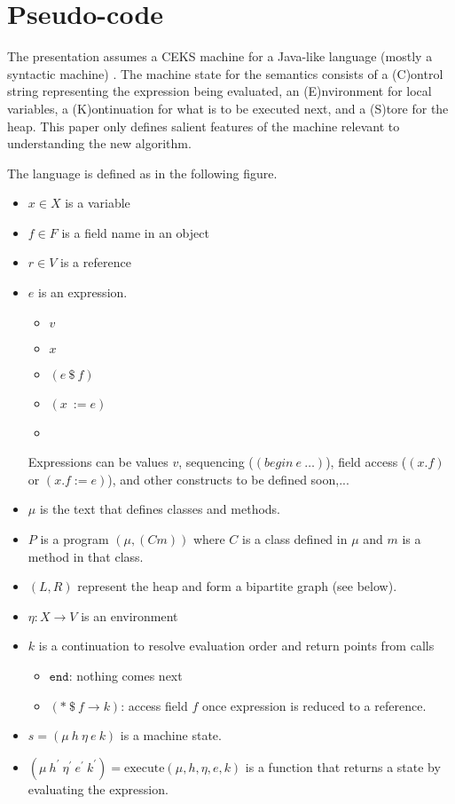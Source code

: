 \section{Pseudo-code}
The presentation assumes a CEKS machine for a Java-like language
(mostly a syntactic machine) \cite{saints-MS}. The machine state for
the semantics consists of a (C)ontrol string representing the
expression being evaluated, an (E)nvironment for local variables, a
(K)ontinuation for what is to be executed next, and a (S)tore for the
heap. This paper only defines salient features of the machine relevant
to understanding the new algorithm.

The language is defined as in the following figure.


\begin{itemize}
\item $x \in X$ is a variable
\item $f\in F$ is a field name in an object
\item $r\in V$ is a reference
\item $e$ is an expression.
  \begin{itemize}
  \item $v$
  \item $x$
  \item $(e\ \$\ f)$
  \item $(x\ := e)$
  \item
  \end{itemize} Expressions can be values $v$, sequencing
  ($(begin\ e\ \ldots)$), field access ($(x.f)$ or $(x.f := e)$), and
  other constructs to be defined soon,...
\item $\mu$ is the text that defines classes and methods.
\item $P$ is a program $(\mu, (C m))$ where $C$ is a class defined in
  $\mu$ and $m$ is a method in that class.
\item $(L,R)$ represent the heap and form a bipartite graph (see below).
\item $\eta : X \rightarrow V$ is an environment
\item $k$ is a continuation to resolve evaluation order and return points from calls
\begin{itemize}
\item $\mathtt{end}$: nothing comes next
\item $(*\ \$\ f \rightarrow k)$: access field $f$ once expression is reduced to a reference.
\end{itemize}
\item $s = (\mu\ h\ \eta\ e\ k)$ is a machine state.
\item $(\mu\ h^\prime\ \eta^\prime\ e^\prime\ k^\prime) =
  \mathrm{execute}(\mu, h, \eta, e, k)$ is a function that returns a
  state by evaluating the expression.
\end{itemize}

